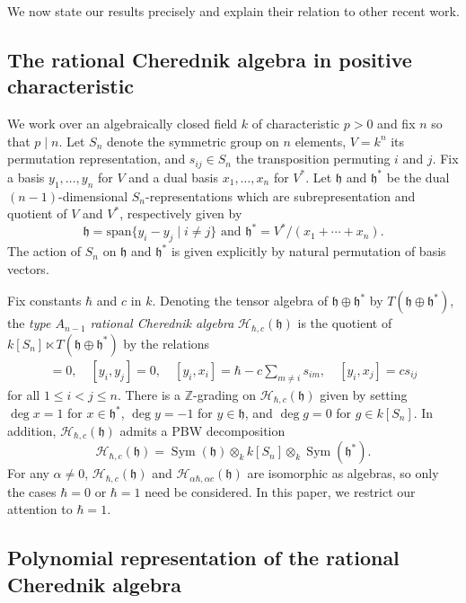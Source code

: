 \documentclass{amsart}
\numberwithin{equation}{section}
\theoremstyle{definition}
\newcommand{\ZZ}{\mathbb{Z}}
\newcommand{\h}{\mathfrak{h}}
\newcommand{\HH}{\mathcal{H}}
\newcommand{\Sym}{\operatorname{Sym}}
\newcommand{\sspan}{\text{span}}
\begin{document}
We now state our results precisely and explain their relation to other recent work.

\subsection{The rational Cherednik algebra in positive characteristic}

We work over an algebraically closed field $k$ of characteristic $p > 0$ and fix $n$ so that $p \mid n$.  Let $S_n$ denote the symmetric group on $n$ elements, $V = k^n$ its permutation representation, and $s_{ij} \in S_n$ the transposition permuting $i$ and $j$.  Fix a basis $y_1,\ldots,y_{n}$ for $V$ and a dual basis $x_1, \ldots, x_{n}$ for $V^*$.  Let $\h$ and $\h^*$ be the dual $(n - 1)$-dimensional $S_n$-representations which are subrepresentation and quotient of $V$ and $V^*$, respectively given by
\[
\h = \sspan\{y_i - y_j \mid i \neq j\} \text{ and } \h^* = V^*/(x_1 + \cdots + x_{n}).
\]
The action of $S_n$ on $\h$ and $\h^*$ is given explicitly by natural permutation of basis vectors.

Fix constants $\hbar$ and $c$ in $k$.  Denoting the tensor algebra of $\h \oplus \h^*$ by $T(\h \oplus \h^*)$, the \textit{type $A_{n - 1}$ rational Cherednik algebra} $\HH_{\hbar, c}(\h)$ is the quotient of $k[S_n] \ltimes T(\h \oplus \h^*)$ by the relations
\begin{align*}
[x_i,x_j]=0, \quad [y_i,y_j] = 0, \quad [y_i,x_i] = \hbar- c \sum_{m \ne i} s_{im},\quad [y_i,x_j] =cs_{ij}\end{align*}
for all $1 \le i < j \le n$.  There is a $\ZZ$-grading on $\HH_{\hbar,c}(\h)$ given by setting $\deg x=1$ for $x \in \h^*$, $\deg y = -1$ for $y \in \h$, and $\deg g=0$ for $g \in k[S_n]$.  In addition, $\HH_{\hbar, c}(\h)$ admits a PBW decomposition 
\[
\HH_{\hbar,c}(\h) = \Sym(\h) \otimes_k k[S_n] \otimes_k \Sym(\h^*).
\]
For any $\alpha \ne 0$, $\HH_{\hbar,c}(\h)$ and $\HH_{\alpha\hbar,\alpha c}(\h)$ are isomorphic as algebras, so only the cases $\hbar = 0$ or $\hbar = 1$ need be considered.  In this paper, we restrict our attention to $\hbar = 1$.

\subsection{Polynomial representation of the rational Cherednik algebra}
\end{document}
